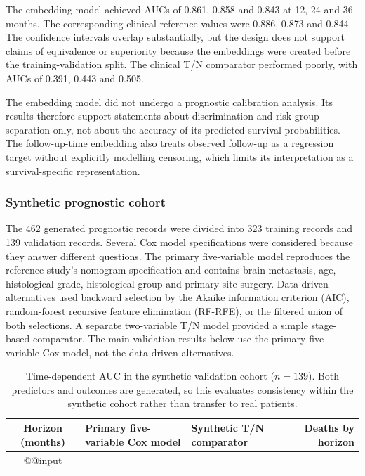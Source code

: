 The embedding model achieved AUCs of 0.861, 0.858 and 0.843 at 12, 24 and 36
months.  The corresponding clinical-reference values were 0.886, 0.873 and
0.844.  The confidence intervals overlap substantially, but the design does not
support claims of equivalence or superiority because the embeddings were created
before the training-validation split.  The clinical T/N comparator performed
poorly, with AUCs of 0.391, 0.443 and 0.505.

The embedding model did not undergo a prognostic calibration analysis.  Its
results therefore support statements about discrimination and risk-group
separation only, not about the accuracy of its predicted survival probabilities.
The follow-up-time embedding also treats observed follow-up as a regression target
without explicitly modelling censoring, which limits its interpretation as a
survival-specific representation.

\subsubsection{Synthetic prognostic cohort}

The 462 generated prognostic records were divided into 323 training records and
139 validation records.  Several Cox model specifications were considered because
they answer different questions.  The primary five-variable model reproduces the
reference study's nomogram specification and contains brain metastasis, age,
histological grade, histological group and primary-site surgery.  Data-driven
alternatives used backward selection by the Akaike information criterion (AIC),
random-forest recursive feature elimination (RF-RFE), or the filtered union of
both selections.  A separate two-variable T/N model provided a simple stage-based
comparator.  The main validation results below use the primary five-variable Cox
model, not the data-driven alternatives.

\begin{table}[htbp]
\centering\small
\caption{Time-dependent AUC in the synthetic validation cohort (\(n=139\)).
Both predictors and outcomes are generated, so this evaluates consistency within
the synthetic cohort rather than transfer to real patients.}
\label{tab:transformed:prog-synthetic}
\begin{tabularx}{\linewidth}{@{}cYYr@{}}
\toprule
Horizon (months) & Primary five-variable Cox model & Synthetic T/N comparator & Deaths by horizon \\
\midrule
\csname @@input
\bottomrule
\end{tabularx}
\end{table}

